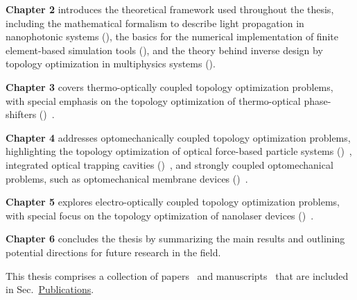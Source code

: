   \textbf{Chapter 2} introduces the theoretical framework used throughout the thesis, including the mathematical formalism
  to describe light propagation in nanophotonic systems (), the basics for the numerical implementation of 
  finite element-based simulation tools (), and the theory behind inverse design by topology optimization in multiphysics systems ().
  
  \textbf{Chapter 3} covers thermo-optically coupled topology optimization problems, with 
  special emphasis on the topology optimization of thermo-optical phase-shifters ()~\cite{ownpub0}.

  
  \textbf{Chapter 4} addresses optomechanically coupled topology optimization problems, highlighting the topology optimization of optical force-based particle systems ()~\cite{ownpub2}, integrated optical trapping cavities ()~\cite{ownpub1, ownpub3}, and strongly coupled optomechanical
  problems, such as optomechanical membrane devices ()~\cite{ownpub5}.
  
  \textbf{Chapter 5} explores electro-optically coupled topology optimization problems, with special focus on the topology optimization of 
  nanolaser devices ()~\cite{ownpub4}.
  
  \textbf{Chapter 6} concludes the thesis by summarizing the main results and outlining potential directions for future research in the field.

This thesis comprises a collection of papers~\cite{ownpub0, ownpub1, ownpub2, ownpub3} and manuscripts~\cite{ownpub4, ownpub5} that
are included in Sec.~\hyperref[sec:publications]{Publications}.